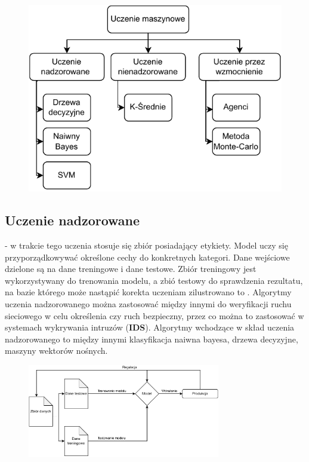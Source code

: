 \begin{figure}[H]
    \centering
    \includegraphics[width=\textwidth]{images/ml-przyklady}
    \label{fig:ml-schema}
\end{figure}
    \subsection{Uczenie nadzorowane} - w trakcie tego uczenia stosuje się zbiór posiadający etykiety. Model uczy się przyporządkowywać określone cechy do konkretnych kategori. Dane wejściowe dzielone są na dane treningowe i dane testowe. Zbiór treningowy jest wykorzystywany do trenowania modelu, a zbió testowy do sprawdzenia rezultatu, na bazie którego może nastąpić korekta uczeniam zilustrowano to . Algorytmy uczenia nadzorowanego można zastosować między innymi do weryfikacji ruchu sieciowego w celu określenia czy ruch bezpieczny, przez co można to zastosować w systemach wykrywania intruzów (\textbf{IDS}). Algorytmy wchodzące w skład uczenia nadzorowanego to między innymi klasyfikacja naiwna bayesa, drzewa decyzyjne, maszyny wektorów nośnych\cite{AiScience, Mahesh2018}.
    \begin{figure}[H]
        \centering
        \includegraphics[width=0.75\textwidth]{images/supervised}
        \label{fig:spervised}
    \end{figure}

